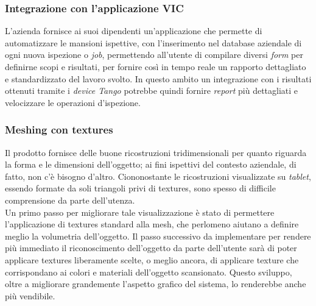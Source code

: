 
\subsubsection{Integrazione con l'applicazione VIC}
L'azienda fornisce ai suoi dipendenti un'applicazione che permette di automatizzare le mansioni ispettive, con l'inserimento nel database aziendale di ogni nuova ispezione o \emph{job}, permettendo all'utente di compilare diversi \emph{form} per definirne scopi e risultati, per fornire così in tempo reale un rapporto dettagliato e standardizzato del lavoro svolto. In questo ambito un integrazione con i risultati ottenuti tramite i \emph{device Tango} potrebbe quindi fornire \emph{report} più dettagliati e velocizzare le operazioni d'ispezione.

\subsubsection{Meshing con textures}
Il prodotto fornisce delle buone ricostruzioni tridimensionali per quanto riguarda la forma e le dimensioni dell'oggetto; ai fini ispettivi del contesto aziendale, di fatto, non c'è bisogno d'altro. Ciononostante le ricostruzioni visualizzate su \emph{tablet}, essendo formate da soli triangoli privi di textures, sono spesso di difficile comprensione da parte dell'utenza.\\ Un primo passo per migliorare tale visualizzazione è stato di permettere l'applicazione di textures standard alla mesh, che perlomeno aiutano a definire meglio la volumetria dell'oggetto. Il passo successivo da implementare per rendere più immediato il riconoscimento dell'oggetto da parte dell'utente sarà di poter applicare textures liberamente scelte, o meglio ancora, di applicare texture che corrispondano ai colori e materiali dell'oggetto scansionato.
Questo sviluppo, oltre a migliorare grandemente l'aspetto grafico del sistema, lo renderebbe anche più vendibile.\\

